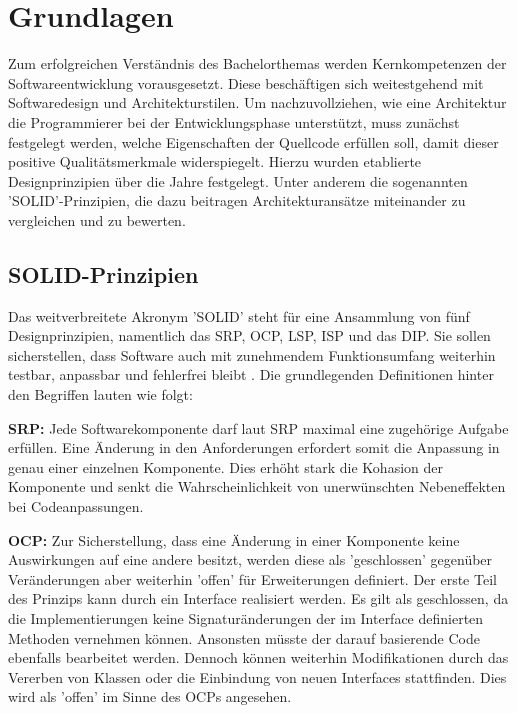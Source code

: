 

\chapter{Grundlagen}

Zum erfolgreichen Verständnis des Bachelorthemas werden Kernkompetenzen der Softwareentwicklung vorausgesetzt. Diese beschäftigen sich weitestgehend mit Softwaredesign und Architekturstilen. Um nachzuvollziehen, wie eine Architektur die Programmierer bei der Entwicklungsphase unterstützt, muss zunächst festgelegt werden, welche Eigenschaften der Quellcode erfüllen soll, damit dieser positive Qualitätsmerkmale widerspiegelt. Hierzu wurden etablierte Designprinzipien über die Jahre festgelegt. Unter anderem die sogenannten 'SOLID'-Prinzipien, die dazu beitragen Architekturansätze miteinander zu vergleichen und zu bewerten.

\section{SOLID-Prinzipien}

Das weitverbreitete Akronym 'SOLID' steht für eine Ansammlung von fünf Designprinzipien, namentlich das \acrfull{SRP}, \acrfull{OCP}, \acrfull{LSP}, \acrfull{ISP} und das \acrfull{DIP}. Sie sollen sicherstellen, dass Software auch mit zunehmendem Funktionsumfang weiterhin testbar, anpassbar und fehlerfrei bleibt \cite{Martin.2000, Martin.2018}. Die grundlegenden Definitionen hinter den Begriffen lauten wie folgt:

\textbf{\acrlong{SRP}: } {Jede Softwarekomponente darf laut SRP maximal eine zugehörige Aufgabe erfüllen. Eine Änderung in den Anforderungen erfordert somit die Anpassung in genau einer einzelnen Komponente. Dies erhöht stark die \Gls{Kohasion} der Komponente und senkt die Wahrscheinlichkeit von unerwünschten Nebeneffekten bei Codeanpassungen. \cite{Martin.SRP, Martin.2018}}

\textbf{\acrlong{OCP}: } Zur Sicherstellung, dass eine Änderung in einer Komponente keine Auswirkungen auf eine andere besitzt, werden diese als 'geschlossen' gegenüber Veränderungen aber weiterhin 'offen' für Erweiterungen definiert. Der erste Teil des Prinzips kann durch ein Interface realisiert werden. Es gilt als geschlossen, da die Implementierungen keine Signaturänderungen der im Interface definierten Methoden vernehmen können. Ansonsten müsste der darauf basierende Code ebenfalls bearbeitet werden. Dennoch können weiterhin Modifikationen durch das Vererben von Klassen oder die Einbindung von neuen Interfaces stattfinden. Dies wird als 'offen' im Sinne des OCPs angesehen. \cite{Martin.2018, Meyer.2009}

